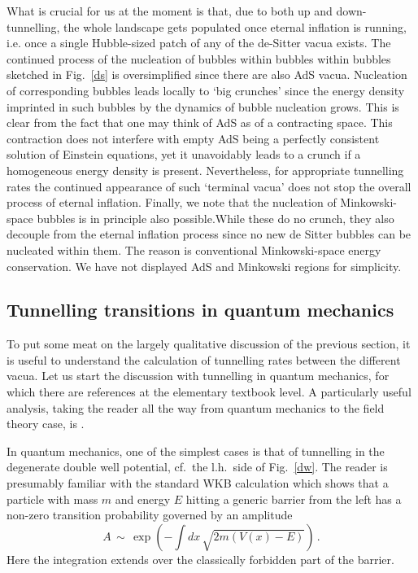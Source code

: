 \documentclass[12pt]{article}
\newcommand{\be}{\begin{equation}}
\newcommand{\ee}{\end{equation}}
\numberwithin{equation}{section}
\begin{document}
What is crucial for us at the moment is that, due to both up and down-tunnelling, the whole landscape gets populated once eternal inflation is running, i.e. once a single Hubble-sized patch of any of the de-Sitter vacua exists. The continued process of the nucleation of bubbles within bubbles within bubbles sketched in Fig.~\ref{ds} is oversimplified since there are also AdS vacua. Nucleation of corresponding bubbles leads locally to `big crunches' since the energy density imprinted in such bubbles by the dynamics of bubble nucleation grows. This is clear from the fact that one may think of AdS as of a contracting space. This contraction does not interfere with empty AdS being a perfectly consistent solution of Einstein equations, yet it unavoidably leads to a crunch if a homogeneous energy density is present. Nevertheless, for appropriate tunnelling rates the continued appearance of such `terminal vacua' does not stop the overall process of eternal inflation. Finally, we note that the nucleation of Minkowski-space bubbles is in principle also possible.While these do no crunch, they also decouple from the eternal inflation process since no new de Sitter bubbles can be nucleated within them. The reason is conventional Minkowski-space energy conservation. We have not displayed AdS and Minkowski regions for simplicity.






\subsection{Tunnelling transitions in quantum mechanics}
\label{tqm}
To put some meat on the largely qualitative discussion of the previous section, it is useful to understand the calculation of tunnelling rates between the different vacua. Let us start the discussion with tunnelling in quantum mechanics, for which there are references at the elementary textbook level. A particularly useful analysis, taking the reader all the way from quantum mechanics to the field theory case, is \cite{Coleman:1985rnk}. 

In quantum mechanics, one of the simplest cases is that of tunnelling in the degenerate double well potential, cf.~the l.h.~side of Fig.~\ref{dw}. The reader is presumably familiar with the standard WKB calculation which shows that a particle with mass $m$ and energy $E$ hitting a generic barrier from the left has a non-zero transition probability governed by an amplitude
\be
A\,\sim\, \exp\left(-\int dx\,\sqrt{2m(V(x)-E)}\right)\,.\label{dw1}
\ee
Here the integration extends over the classically forbidden part of the barrier.
\end{document}
